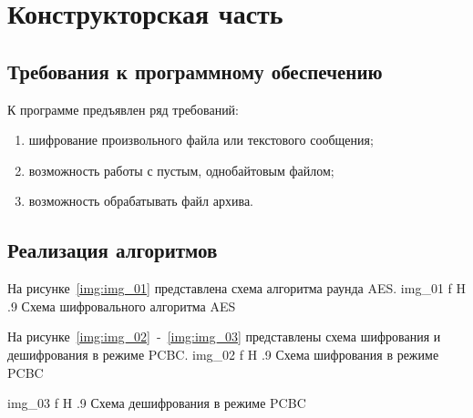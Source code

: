\chapter{Конструкторская часть}

\section{Требования к программному обеспечению}

К программе предъявлен ряд требований:
\begin{enumerate}
	\item шифрование произвольного файла или текстового сообщения;
	\item возможность работы с пустым, однобайтовым файлом;
	\item возможность обрабатывать файл архива.
\end{enumerate}

\section{Реализация алгоритмов}

На рисунке~\ref{img:img_01} представлена схема алгоритма раунда AES.
	{img_01}
	{f}
	{H}
	{.9\textwidth}
	{Схема шифровального алгоритма AES}

\clearpage

На рисунке~\ref{img:img_02}~-~\ref{img:img_03} представлены схема шифрования и дешифрования в режиме PCBC.
	{img_02}
	{f}
	{H}
	{.9\textwidth}
	{Схема шифрования в режиме PCBC}

	{img_03}
	{f}
	{H}
	{.9\textwidth}
	{Схема дешифрования в режиме PCBC}
	
	
	
